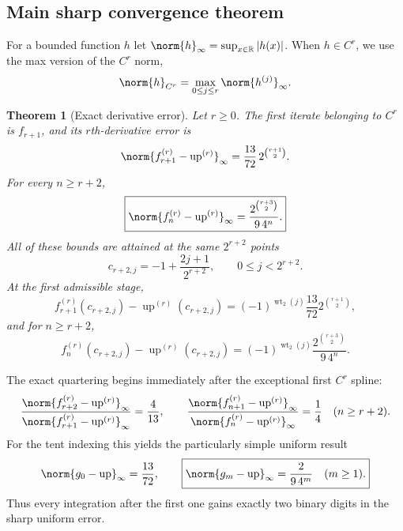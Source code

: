 \documentclass[11pt,oneside]{article}
\newtheorem{theorem}{Theorem}[section]
\theoremstyle{definition}
\theoremstyle{remark}
\newcommand{\R}{\mathbb R}
\newcommand{\Up}{\operatorname{up}}
\newcommand{\wt}{\operatorname{wt}_2}
\begin{document}
\subsection{Main sharp convergence theorem}

For a bounded function $h$ let $\norm{h}_\infty=\sup_{x\in\R}|h(x)|$.  When $h\in C^r$,
we use the max version of the $C^r$ norm,
\begin{equation}
 \norm{h}_{C^r}=\max_{0\le j\le r}\norm{h^{(j)}}_\infty.
 \label{repeated2:eq:Cr-norm}
\end{equation}

\begin{theorem}[Exact derivative error]
\label{repeated2:thm:main-exact-rate-intro}
Let $r\ge0$.
The first iterate belonging to $C^r$ is $f_{r+1}$, and its $r$th-derivative error is
\begin{equation}
 \norm{f_{r+1}^{(r)}-\Up^{(r)}}_\infty
 =\frac{13}{72}\,2^{\binom{r+1}{2}}.
 \label{repeated2:eq:first-admissible-error}
\end{equation}
For every $n\ge r+2$,
\begin{equation}
 \boxed{\displaystyle
 \norm{f_n^{(r)}-\Up^{(r)}}_\infty
 =\frac{2^{\binom{r+3}{2}}}{9\,4^n}.}
 \label{repeated2:eq:main-exact-rate}
\end{equation}
All of these bounds are attained at the same $2^{r+2}$ points
\begin{equation}
 c_{r+2,j}=-1+\frac{2j+1}{2^{r+2}},
 \qquad 0\le j<2^{r+2}.
 \label{repeated2:eq:error-extremizer-grid}
\end{equation}
At the first admissible stage,
\begin{equation}
 f_{r+1}^{(r)}(c_{r+2,j})-\Up^{(r)}(c_{r+2,j})
 =(-1)^{\wt(j)}\frac{13}{72}2^{\binom{r+1}{2}},
 \label{repeated2:eq:signed-first-stage-error}
\end{equation}
and for $n\ge r+2$,
\begin{equation}
 f_n^{(r)}(c_{r+2,j})-\Up^{(r)}(c_{r+2,j})
 =(-1)^{\wt(j)}\frac{2^{\binom{r+3}{2}}}{9\,4^n}.
 \label{repeated2:eq:signed-extremizer-error}
\end{equation}
\end{theorem}

The exact quartering begins immediately after the exceptional first $C^r$ spline:
\begin{equation}
 \frac{\norm{f_{r+2}^{(r)}-\Up^{(r)}}_\infty}
 {\norm{f_{r+1}^{(r)}-\Up^{(r)}}_\infty}=\frac4{13},
 \qquad
 \frac{\norm{f_{n+1}^{(r)}-\Up^{(r)}}_\infty}
 {\norm{f_n^{(r)}-\Up^{(r)}}_\infty}=\frac14
 \quad(n\ge r+2).
 \label{repeated2:eq:exact-error-ratios}
\end{equation}
For the tent indexing this yields the particularly simple uniform result
\begin{equation}
 \norm{g_0-\Up}_\infty=\frac{13}{72},
 \qquad
 \boxed{\displaystyle
 \norm{g_m-\Up}_\infty=\frac{2}{9\,4^m}\quad(m\ge1).}
 \label{repeated2:eq:tent-uniform-rate}
\end{equation}
Thus every integration after the first one gains exactly two binary digits in the sharp
uniform error.
\end{document}
